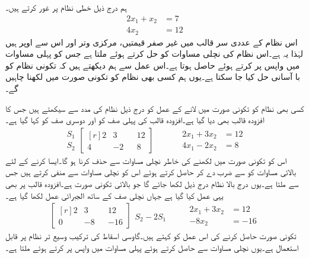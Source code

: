 ہم درج ذیل خطی نظام پر غور کرتے ہیں۔
\begin{align*}
2x_1+x_2&=7\\
4x_2&=12
\end{align*}
اس نظام کے عددی سر قالب میں غیر صفر قیمتیں، مرکزی وتر اور اس سے اوپر ہیں لہٰذا یہ  ہے۔اس نظام کی نچلی مساوات کو حل کرتے ہوئے  ملتا ہے جس کو پہلی مساوات میں واپس پر کرتے ہوئے  حاصل ہوتا ہے۔اس عمل سے ہم دیکھتے ہیں کہ تکونی نظام کو با آسانی حل کیا جا سکتا ہے۔یوں ہم  کسی بھی نظام کو تکونی صورت میں لکھنا چاہیں گے۔

کسی بھی نظام کو تکونی صورت میں لانے کے عمل کو درج ذیل نظام کی مدد سے سیکھتے ہیں جس کا افزودہ قالب بھی دیا گیا ہے۔افزودہ قالب کی پہلی صف کو  اور دوسری صف کو  کہا گیا ہے۔
\begin{gather*}
\begin{matrix} S_1\\S_2 \end{matrix}\begin{bmatrix*}[r]2&3&&12\\ 4&-2&&8  \end{bmatrix*}\quad \quad\quad 
\begin{aligned}
2x_1+3x_2&=12\\
4x_1-2x_2&=8
\end{aligned}
\end{gather*} 
اس کو تکونی صورت میں لکھنے کی خاطر نچلی مساوات سے  حذف کرنا ہو گا۔ایسا کرنے کے لئے بالائی مساوات کو  سے ضرب دے کر 
 حاصل کرتے ہوئے اس کو  نچلی مساوات سے منفی کرتے ہیں جس سے  ملتا ہے۔یوں درج بالا نظام درج ذیل لکھا جائے گا جو بالائی تکونی صورت ہے۔افزودہ قالب پر بھی یہی عمل کیا گیا ہے جہاں نچلی صف کے  ساتھ الجبرائی عمل  لکھا گیا ہے۔
\begin{gather*}
\begin{bmatrix*}[r] 2&3&&12\\0 &-8&&-16 \end{bmatrix*}\begin{matrix} \\ S_2-2S_1 \end{matrix}\quad \quad
 \begin{aligned}
2x_1+3x_2&=12\\
-8x_2&=-16
\end{aligned} 
\end{gather*} 
تکونی صورت حاصل کرنے کی اس عمل کو  کہتے ہیں۔گاوسی اسقاط کی ترکیب وسیع تر نظام پر قابل استعمال ہے۔یوں نچلی مساوات سے  حاصل کرتے ہوئے پہلی مساوات میں واپس پر کرتے ہوئے  ملتا ہے۔

